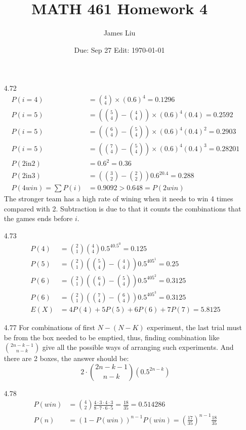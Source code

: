 \documentclass{article}
\date{Due: Sep 27  Edit: \today}
\title{MATH 461 Homework 4}
\author{James Liu}
\begin{document}
\maketitle
\begin{itemize}
    \item [4.72]
    \begin{align*}
        P(i=4) & = \binom{4}{4} \times (0.6)^4 =0.1296\\
        P(i=5) & = (\binom{5}{4}-\binom{4}{4}) \times (0.6)^4(0.4) = 0.2592\\
        P(i=5) & = (\binom{6}{4}-\binom{5}{4}) \times (0.6)^4(0.4)^2 = 0.2903\\
        P(i=5) & = (\binom{7}{4}-\binom{5}{4}) \times (0.6)^4(0.4)^3= 0.28201\\
        P(2\text{in}2) &=0.6^2 = 0.36\\
        P(2\text{in}3) &=(\binom{3}{2}-\binom{2}{2}) 0.6^20.4 = 0.288\\
        P(4win) = \sum P(i) &= 0.9092> 0.648 = P(2win)
    \end{align*}
    The stronger team has a high rate of wining when it needs to win 4 times compared with 2. Subtraction is due to that it counts the combinations that the games ends before \(i\).
    \item [4.73]
    \begin{align*}
        P(4) &=\binom{2}{1}\binom{4}{4} 0.5^40.5^0 = 0.125\\
        P(5) &=\binom{2}{1}(\binom{5}{4}-\binom{4}{4}) 0.5^405^1 = 0.25\\
        P(6) &=\binom{2}{1}(\binom{6}{4}-\binom{5}{4}) 0.5^405^2  = 0.3125\\
        P(6) &=\binom{2}{1}(\binom{7}{4}-\binom{6}{4}) 0.5^405^3  = 0.3125\\
        E(X) &=4P(4)+5P(5)+6P(6)+7P(7) = 5.8125
    \end{align*}
    \item [4.77]
    For combinations of first \(N-(N-K)\) experiment, the last trial must be from the box needed to be emptied, thus, finding combination like \(\binom{2n-k-1}{n-k}\) give all the possible ways of arranging such experiments. And there are 2 boxes, the answer should be:\[2\cdot \binom{2n-k-1}{n-k}(0.5^{2n-k})\]
    \item [4.78]
    \begin{align*}
        P(win) &= \binom{4}{2}\frac{4\cdot3\cdot4\cdot3}{8\cdot7\cdot6\cdot5} = \frac{18}{35} = 0.514286\\
        P(n) & = (1-P(win))^{n-1}P(win) = \left(\frac{17}{35}\right)^{n-1}\frac{18}{35}

\end{align*}
\end{itemize}
\end{document}
